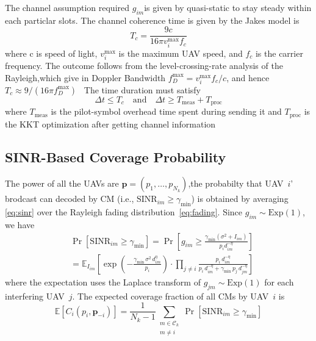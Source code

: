 \documentclass[journal]{IEEEtran}
\begin{document}
The channel assumption required $g_{im}$is given by quasi-static  to stay steady within each particlar slots. The channel coherence time is given by the Jakes model is
\begin{equation}\label{eq:Tc}
  T_{c}=\frac{9c}{16\pi v_{i}^{\max}f_{c}}
\end{equation}
where c is speed of light, $v_{i}^{\max}$ is the
maximum UAV speed, and $f_{c}$ is the carrier
frequency.  The outcome follows from the level-crossing-rate analysis of the Rayleigh,which give in Doppler Bandwidth
$f_{D}^{\max}=v_{i}^{\max}f_{c}/c$, and hence
$T_{c}\approx 9/(16\pi f_{D}^{\max})$~\cite{ref9}
The time duration must satisfy
\begin{equation}\label{eq:dt}
  \Delta t \leq T_{c}
  \quad\text{and}\quad
  \Delta t \geq T_{\mathrm{meas}}+T_{\mathrm{proc}}
\end{equation}
where $T_{\mathrm{meas}}$ is the pilot-symbol overhead time spent during sending it and
$T_{\mathrm{proc}}$ is the KKT optimization after getting channel information


\subsection{SINR-Based Coverage Probability}

The power of all the UAVs are $\mathbf{p}=(p_{1},\ldots,p_{N_{k}})$,the probabilty that UAV~$i$' brodcast can decoded by CM
(i.e., $\mathrm{SINR}_{im}\geq\gamma_{\min}$) is obtained
by averaging \eqref{eq:sinr} over the Rayleigh fading
distribution~\eqref{eq:fading}.  Since
$g_{im}\sim\mathrm{Exp}(1)$, we have
\begin{align}
  &\Pr[\mathrm{SINR}_{im}\geq\gamma_{\min}]
  =\Pr\!\left[g_{im}\geq
  \frac{\gamma_{\min}(\sigma^{2}+I_{im})}
       {p_{i}d_{im}^{-\eta}}\right]\nonumber\\
  &=\mathbb{E}_{I_{im}}\!\left[
  \exp\!\left(-\frac{\gamma_{\min}\,\sigma^{2}\,d_{im}^{\eta}}
                    {p_{i}}\right)
  \cdot\prod_{j\neq i}
  \frac{p_{i}\,d_{im}^{-\eta}}
       {p_{i}\,d_{im}^{-\eta}+\gamma_{\min}\,p_{j}\,d_{jm}^{-\eta}}
  \right]\label{eq:coverage_prob}
\end{align}
where the expectation uses the Laplace transform of
$g_{jm}\sim\mathrm{Exp}(1)$ for each interfering UAV~$j$.
The expected coverage fraction of all CMs by UAV~$i$ is
\begin{equation}\label{eq:EC}
  \mathbb{E}[C_{i}(p_{i},\mathbf{p}_{-i})]
  =\frac{1}{N_{k}-1}\sum_{\substack{m\in\mathcal{C}_{k}\\m\neq i}}
  \Pr[\mathrm{SINR}_{im}\geq\gamma_{\min}]
\end{equation}
\end{document}
